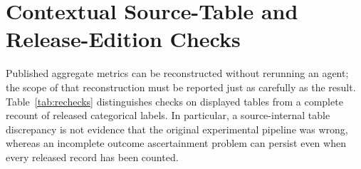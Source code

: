 \section{Contextual Source-Table and Release-Edition Checks}\label{app:context}
Published aggregate metrics can be reconstructed without rerunning an agent; the scope of that reconstruction must be reported just as carefully as the result. Table~\ref{tab:rechecks} distinguishes checks on displayed tables from a complete recount of released categorical labels. In particular, a source-internal table discrepancy is not evidence that the original experimental pipeline was wrong, whereas an incomplete outcome ascertainment problem can persist even when every released record has been counted.


